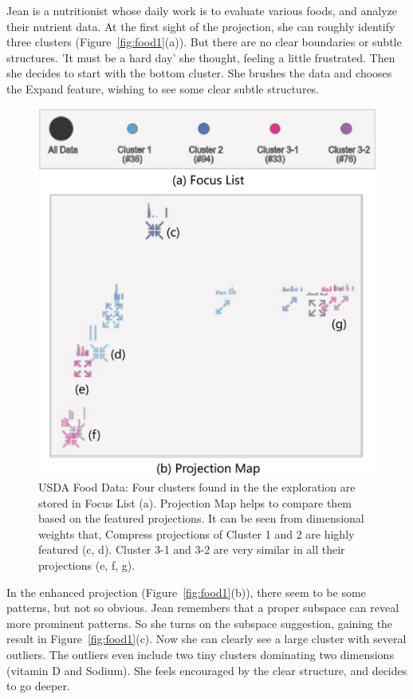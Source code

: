 Jean is a nutritionist whose daily work is to evaluate various foods, and analyze their nutrient data. At the first sight of the projection, she can roughly identify three clusters (Figure~\ref{fig:food1}(a)). But there are no clear boundaries or subtle structures. 'It must be a hard day' she thought, feeling a little frustrated. Then she decides to start with the bottom cluster. She brushes the data and chooses the Expand feature, wishing to see some clear subtle structures.

\begin{figure}[htbp]
\centering
  \includegraphics[width=0.85\linewidth]{images/map_2.eps}%
  \caption{USDA Food Data: Four clusters found in the the exploration are stored in Focus List (a). Projection Map helps to compare them based on the featured projections. It can be seen from dimensional weights that, Compress projections of Cluster 1 and 2 are highly featured (c, d). Cluster 3-1 and 3-2 are very similar in all their projections (e, f, g).}
\label{fig:map}
  \end{figure}

In the enhanced projection (Figure~\ref{fig:food1}(b)), there seem to be some patterns, but not so obvious. Jean remembers that a proper subspace can reveal more prominent patterns. So she turns on the subspace suggestion, gaining the result in Figure~\ref{fig:food1}(c). Now she can clearly see a large cluster with several outliers. The outliers even include two tiny clusters dominating two dimensions (vitamin D and Sodium). She feels encouraged by the clear structure, and decides to go deeper.

